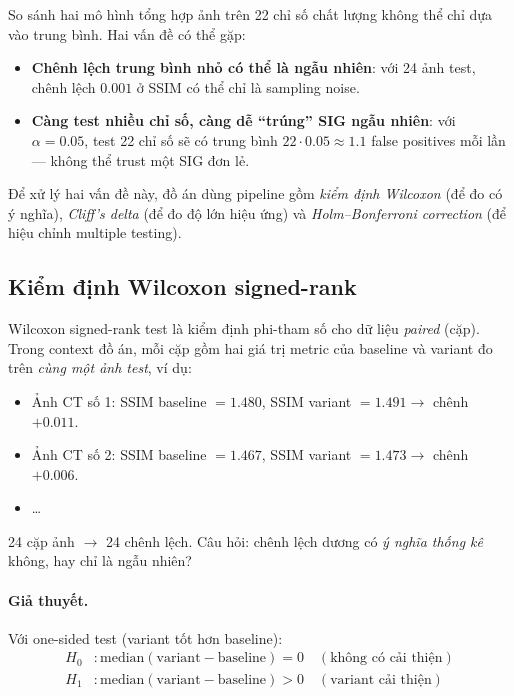 So sánh hai mô hình tổng hợp ảnh trên 22 chỉ số chất lượng không thể chỉ dựa vào trung bình. Hai vấn đề có thể gặp:
\begin{itemize}\itemsep0pt
    \item \textbf{Chênh lệch trung bình nhỏ có thể là ngẫu nhiên}: với 24 ảnh test, chênh lệch $0.001$ ở SSIM có thể chỉ là sampling noise.
    \item \textbf{Càng test nhiều chỉ số, càng dễ ``trúng'' SIG ngẫu nhiên}: với $\alpha = 0.05$, test 22 chỉ số sẽ có trung bình $22 \cdot 0.05 \approx 1.1$ false positives mỗi lần --- không thể trust một SIG đơn lẻ.
\end{itemize}
Để xử lý hai vấn đề này, đồ án dùng pipeline gồm \emph{kiểm định Wilcoxon} (để đo có ý nghĩa), \emph{Cliff's delta} (để đo độ lớn hiệu ứng) và \emph{Holm--Bonferroni correction} (để hiệu chỉnh multiple testing).

\subsection{Kiểm định Wilcoxon signed-rank}
\label{ssec:wilcoxon}

Wilcoxon signed-rank test \cite{wilcoxon1945individual} là kiểm định phi-tham số cho dữ liệu \emph{paired} (cặp). Trong context đồ án, mỗi cặp gồm hai giá trị metric của baseline và variant đo trên \emph{cùng một ảnh test}, ví dụ:
\begin{itemize}\itemsep0pt
    \item Ảnh CT số 1: SSIM baseline $= 1.480$, SSIM variant $= 1.491 \to$ chênh $+0.011$.
    \item Ảnh CT số 2: SSIM baseline $= 1.467$, SSIM variant $= 1.473 \to$ chênh $+0.006$.
    \item \ldots
\end{itemize}
24 cặp ảnh $\to$ 24 chênh lệch. Câu hỏi: chênh lệch dương có \emph{ý nghĩa thống kê} không, hay chỉ là ngẫu nhiên?

\paragraph{Giả thuyết.}
Với one-sided test (variant tốt hơn baseline):
\begin{align*}
H_0 &: \text{median}(\text{variant} - \text{baseline}) = 0 \quad (\text{không có cải thiện}) \\
H_1 &: \text{median}(\text{variant} - \text{baseline}) > 0 \quad (\text{variant cải thiện})
\end{align*}

